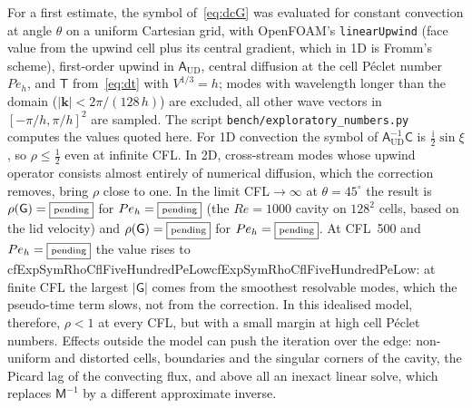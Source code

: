 \documentclass[11pt,a4paper]{article}
\newcommand{\cfpendingmark}{\fbox{\scriptsize pending}}
\newcommand{\cfnum}[1]{%
  \ifcsname cf#1\endcsname\csname cf#1\endcsname\else\cfpendingmark\fi}
\newcommand{\vect}[1]{\mathbf{#1}}
\newcommand{\code}[1]{\texttt{#1}}
\begin{document}
For a first estimate, the symbol of~\eqref{eq:dcG} was evaluated for constant
convection at angle $\theta$ on a uniform Cartesian grid, with OpenFOAM's
\code{linearUpwind} (face value from the upwind cell plus its central
gradient, which in 1D is Fromm's scheme), first-order upwind in
$\mathsf A_{\mathrm{UD}}$, central diffusion at the cell P\'eclet number
$Pe_h$, and $\mathsf T$ from~\eqref{eq:dt} with $V^{1/3}=h$; modes with
wavelength longer than the domain ($|\vect k|<2\pi/(128\,h)$) are excluded,
all other wave vectors in $[-\pi/h,\pi/h]^2$ are sampled. The script
\code{bench/exploratory\_numbers.py} computes the values quoted here. For 1D
convection the symbol of
$\mathsf A_{\mathrm{UD}}^{-1}\mathsf C$ is $\tfrac{\mathrm i}{2}\sin\xi$, so
$\rho\le\tfrac12$ even at infinite CFL. In 2D, cross-stream modes whose
upwind operator consists almost entirely of numerical diffusion, which the
correction removes, bring $\rho$ close to one. In the limit CFL$\to\infty$ at
$\theta=45^\circ$ the result is $\rho(\mathsf G)=\cfnum{ExpSymRhoInfPeLow}$ for
$Pe_h=\cfnum{ExpSymPeLow}$ (the $Re=1000$ cavity on $128^2$ cells, based on
the lid velocity) and $\rho(\mathsf G)=\cfnum{ExpSymRhoInfPeHigh}$ for
$Pe_h=\cfnum{ExpSymPeHigh}$. At CFL~500 and $Pe_h=\cfnum{ExpSymPeLow}$ the
value rises to \cfnum{ExpSymRhoCflFiveHundredPeLow}: at finite CFL the
largest $|\mathsf G|$ comes from the smoothest resolvable modes, which the
pseudo-time term slows, not from the correction. In this idealised model, therefore, $\rho<1$ at every CFL,
but with a small margin at high cell P\'eclet numbers. Effects outside the
model can push the iteration over the edge: non-uniform and distorted cells,
boundaries and the singular corners of the cavity, the Picard lag of the
convecting flux, and above all an inexact linear solve, which replaces
$\mathsf M^{-1}$ by a different approximate inverse.
\end{document}

